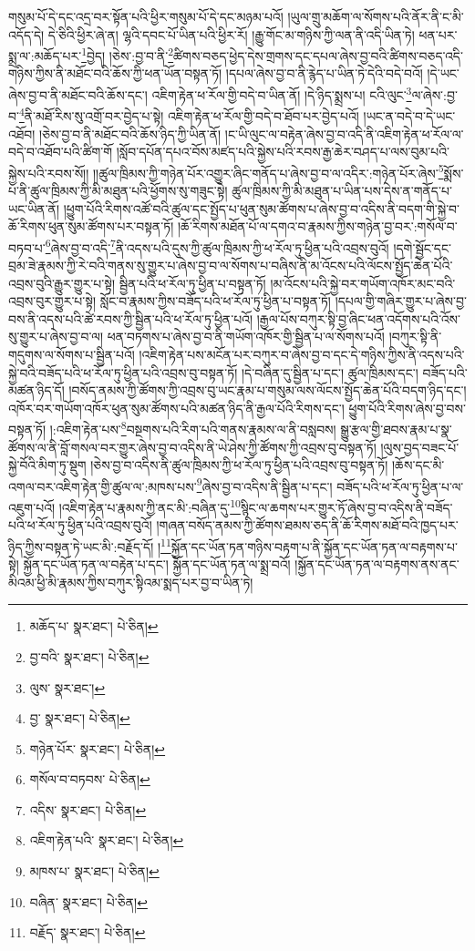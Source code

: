 གསུམ་པོ་དེ་དང་འདྲ་བར་སྟོན་པའི་ཕྱིར་གསུམ་པོ་དེ་དང་མཉམ་པའོ། །ཡུལ་གྲུ་མཆོག་ལ་སོགས་པའི་ནོར་ནི་ང་མི་འདོད་དེ། དེ་ཅིའི་ཕྱིར་ཞེ་ན། ལྷའི་དབང་པོ་ཡིན་པའི་ཕྱིར་རོ། །རྒྱུ་གོང་མ་གཉིས་ཀྱི་ལན་ནི་འདི་ཡིན་ཏེ། ཕན་པར་སྨྲ་ལ་:མཆོད་པར་\footnote{མཆོད་པ་  སྣར་ཐང་།  པེ་ཅིན། }བྱེད། །ཅེས་:བྱ་བ་ནི་\footnote{བྱ་བའི་  སྣར་ཐང་།  པེ་ཅིན། }ཚིགས་བཅད་ཕྱེད་དེས་གྲགས་དང་དཔལ་ཞེས་བྱ་བའི་ཚིགས་བཅད་འདི་གཉིས་ཀྱིས་ནི་མཐོང་བའི་ཆོས་ཀྱི་ཕན་ཡོན་བསྟན་ཏོ། །དཔལ་ཞེས་བྱ་བ་ནི་རྙེད་པ་ཡིན་ཏེ་དེའི་བདེ་བའོ། །དེ་ཡང་ཞེས་བྱ་བ་ནི་མཐོང་བའི་ཆོས་དང་། འཇིག་རྟེན་ཕ་རོལ་གྱི་བདེ་བ་ཡིན་ནོ། །དེ་ཉིད་སྨྲས་པ། ངའི་ལུང་\footnote{ལུས་  སྣར་ཐང་། }ལ་ཞེས་:བྱ་བ་\footnote{བྱ་  སྣར་ཐང་།  པེ་ཅིན། }ནི་མཐོ་རིས་སུ་འགྲོ་བར་བྱེད་པ་སྟེ། འཇིག་རྟེན་ཕ་རོལ་གྱི་བདེ་བ་ཐོབ་པར་བྱེད་པའོ། །ཡང་ན་བདེ་བ་དེ་ཡང་འཐོབ། །ཅེས་བྱ་བ་ནི་མཐོང་བའི་ཆོས་ཉིད་ཀྱི་ཡིན་ནོ། །ང་ཡི་ལུང་ལ་བརྟེན་ཞེས་བྱ་བ་འདི་ནི་འཇིག་རྟེན་ཕ་རོལ་ལ་བདེ་བ་འཐོབ་པའི་ཚིག་གོ །སློབ་དཔོན་དཔའ་བོས་མཛད་པའི་སྐྱེས་པའི་རབས་རྒྱ་ཆེར་བཤད་པ་ལས་བུམ་པའི་སྐྱེས་པའི་རབས་སོ།། །།ཚུལ་ཁྲིམས་ཀྱི་གཉེན་པོར་འགྱུར་ཞིང་གནོད་པ་ཞེས་བྱ་བ་ལ་འདིར་:གཉེན་པོར་ཞེས་\footnote{གཉེན་པོར་  སྣར་ཐང་།  པེ་ཅིན། }སྨོས་པ་ནི་ཚུལ་ཁྲིམས་ཀྱི་མི་མཐུན་པའི་ཕྱོགས་སུ་གཟུང་སྟེ། ཚུལ་ཁྲིམས་ཀྱི་མི་མཐུན་པ་ཡིན་པས་དེས་ན་གནོད་པ་ཡང་ཡིན་ནོ། །ཕྱུག་པོའི་རིགས་འཚོ་བའི་ཚུལ་དང་སྤྱོད་པ་ཕུན་སུམ་ཚོགས་པ་ཞེས་བྱ་བ་འདིས་ནི་བདག་གི་སྐྱེ་བ་ཆོ་རིགས་ཕུན་སུམ་ཚོགས་པར་བསྟན་ཏོ། །ཆོ་རིགས་མཐོན་པོ་ལ་དགའ་བ་རྣམས་ཀྱིས་གཉེན་བྱ་བར་:གསོལ་བ་བཏབ་པ་\footnote{གསོལ་བ་བཏབས་  པེ་ཅིན། }ཞེས་བྱ་བ་འདི་\footnote{འདིས་  སྣར་ཐང་།  པེ་ཅིན། }ནི་འདས་པའི་དུས་ཀྱི་ཚུལ་ཁྲིམས་ཀྱི་ཕ་རོལ་ཏུ་ཕྱིན་པའི་འབྲས་བུའོ། །དགེ་སྦྱོང་དང་བྲམ་ཟེ་རྣམས་ཀྱི་རེ་བའི་གནས་སུ་གྱུར་པ་ཞེས་བྱ་བ་ལ་སོགས་པ་བཞིས་ནི་མ་འོངས་པའི་ལོངས་སྤྱོད་ཆེན་པོའི་འབྲས་བུའི་རྒྱུར་གྱུར་པ་སྟེ། སྦྱིན་པའི་ཕ་རོལ་ཏུ་ཕྱིན་པ་བསྟན་ཏོ། །མ་འོངས་པའི་སྐྱེ་བར་གཡོག་འཁོར་མང་བའི་འབྲས་བུར་གྱུར་པ་སྟེ། སློང་བ་རྣམས་ཀྱིས་བཟོད་པའི་ཕ་རོལ་ཏུ་ཕྱིན་པ་བསྟན་ཏོ། །དཔལ་གྱི་གཞིར་གྱུར་པ་ཞེས་བྱ་བས་ནི་འདས་པའི་ཚེ་རབས་ཀྱི་སྦྱིན་པའི་ཕ་རོལ་ཏུ་ཕྱིན་པའོ། །རྒྱལ་པོས་བཀུར་སྟི་བྱ་ཞིང་ཕན་འདོགས་པའི་འོས་སུ་གྱུར་པ་ཞེས་བྱ་བ་ལ། ཕན་བཏགས་པ་ཞེས་བྱ་བ་ནི་གཡོག་འཁོར་གྱི་སྦྱིན་པ་ལ་སོགས་པའོ། །བཀུར་སྟི་ནི་གདུགས་ལ་སོགས་པ་སྦྱིན་པའོ། །འཇིག་རྟེན་པས་མངོན་པར་བཀུར་བ་ཞེས་བྱ་བ་དང་དེ་གཉིས་ཀྱིས་ནི་འདས་པའི་སྐྱེ་བའི་བཟོད་པའི་ཕ་རོལ་ཏུ་ཕྱིན་པའི་འབྲས་བུ་བསྟན་ཏོ། །དེ་བཞིན་དུ་སྦྱིན་པ་དང་། ཚུལ་ཁྲིམས་དང་། བཟོད་པའི་མཚན་ཉིད་དོ། །བསོད་ནམས་ཀྱི་ཚོགས་ཀྱི་འབྲས་བུ་ཡང་རྣམ་པ་གསུམ་ལས་ལོངས་སྤྱོད་ཆེན་པོའི་བདག་ཉིད་དང་། འཁོར་བར་གཡོག་འཁོར་ཕུན་སུམ་ཚོགས་པའི་མཚན་ཉིད་ནི་རྒྱལ་པོའི་རིགས་དང་། ཕྱུག་པོའི་རིགས་ཞེས་བྱ་བས་བསྟན་ཏོ། །:འཇིག་རྟེན་པས་\footnote{འཇིག་རྟེན་པའི་  སྣར་ཐང་།  པེ་ཅིན། }བསྔགས་པའི་རིག་པའི་གནས་རྣམས་ལ་ནི་བསླབས། སྒྱུ་རྩལ་གྱི་ཐབས་རྣམ་པ་སྣ་ཚོགས་ལ་ནི་བློ་གསལ་བར་གྱུར་ཞེས་བྱ་བ་འདིས་ནི་ཡེ་ཤེས་ཀྱི་ཚོགས་ཀྱི་འབྲས་བུ་བསྟན་ཏོ། །ལུས་བྱད་བཟང་པོ་སྐྱེ་བོའི་མིག་ཏུ་སྡུག །ཅེས་བྱ་བ་འདིས་ནི་ཚུལ་ཁྲིམས་ཀྱི་ཕ་རོལ་ཏུ་ཕྱིན་པའི་འབྲས་བུ་བསྟན་ཏོ། །ཆོས་དང་མི་འགལ་བར་འཇིག་རྟེན་གྱི་ཚུལ་ལ་:མཁས་པས་\footnote{མཁས་པ་  སྣར་ཐང་།  པེ་ཅིན། }ཞེས་བྱ་བ་འདིས་ནི་སྦྱིན་པ་དང་། བཟོད་པའི་ཕ་རོལ་ཏུ་ཕྱིན་པ་ལ་འཇུག་པའོ། །འཇིག་རྟེན་པ་རྣམས་ཀྱི་ནང་མི་:བཞིན་དུ་\footnote{བཞིན་  སྣར་ཐང་།  པེ་ཅིན། }སྙིང་ལ་ཆགས་པར་གྱུར་ཏོ་ཞེས་བྱ་བ་འདིས་ནི་བཟོད་པའི་ཕ་རོལ་ཏུ་ཕྱིན་པའི་འབྲས་བུའོ། །གཞན་བསོད་ནམས་ཀྱི་ཚོགས་ཐམས་ཅད་ནི་ཆོ་རིགས་མཐོ་བའི་ཁྱད་པར་ཉིད་ཀྱིས་བསྟན་ཏེ་ཡང་མི་:བརྗོད་དོ། །\footnote{བརྗོད་  སྣར་ཐང་།  པེ་ཅིན། }སྐྱོན་དང་ཡོན་ཏན་གཉིས་བརྟག་པ་ནི་སྐྱོན་དང་ཡོན་ཏན་ལ་བརྟགས་པ་སྟེ། སྐྱོན་དང་ཡོན་ཏན་ལ་བརྟེན་པ་དང་། སྐྱོན་དང་ཡོན་ཏན་ལ་སྨྲ་བའོ། །སྐྱོན་དང་ཡོན་ཏན་ལ་བརྟགས་ནས་ནང་མིའམ་ཕྱི་མི་རྣམས་ཀྱིས་བཀུར་སྟིའམ་སྨད་པར་བྱ་བ་ཡིན་ཏེ། 